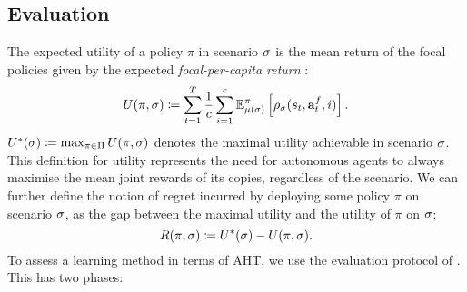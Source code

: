 \subsection{Evaluation}
The expected utility of a policy $\pi$ in scenario $\sigma$ is the mean return of the focal policies given by the expected \emph{focal-per-capita return} \citep{leibo_scalable_evaluation_multi_2021, agapiou_melting_pot_2_2023}:
\begin{equation}
    \label{eq:EU}
    U(\pi, \sigma) \coloneqq 
    \sum_{t=1}^T  \dfrac{1}{c} \sum_{i=1}^c \mathbb{E}^{\pi}_{\mu(\sigma)}\left[\rho_\sigma(s_t, \mathbf{a}^f_t, i) \right].
\end{equation}
$U^*(\sigma) \coloneqq \max_{\pi\in \Pi} U(\pi, \sigma)$ denotes the maximal utility achievable in scenario $\sigma$. This definition for utility represents the need for autonomous agents to always maximise the mean joint rewards of its copies, regardless of the scenario.
We can further define the notion of regret incurred by deploying some policy $\pi$ on scenario $\sigma$, as the gap between the maximal utility and the utility of $\pi$ on $\sigma$:
\begin{equation}
    \label{eq:regret}
    R(\pi,\sigma) \coloneqq U^*(\sigma) - U(\pi, \sigma).
\end{equation}
To assess a learning method in terms of AHT, we use the evaluation protocol of \citet{leibo_scalable_evaluation_multi_2021}. This has two phases:
